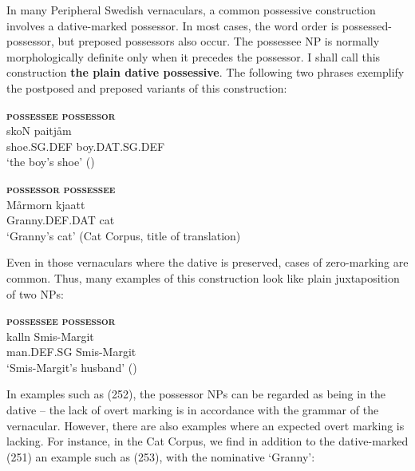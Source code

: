 In many Peripheral Swedish vernaculars, a common possessive construction involves a dative-marked possessor. In most cases, the word order is possessed-possessor, but preposed possessors also occur. The possessee NP is normally morphologically definite only when it precedes the possessor. I shall call this construction \textbf{the plain dative possessive}. The following two phrases exemplify the postposed and preposed variants of this construction:


\renewcommand{\eachwordone}{\scshape}
\renewcommand{\eachwordtwo}{\itshape}

\ea\label{}
	\glll \textbf{\textsc{possessee}} \textbf{\textsc{possessor}} \\
	skoN  paitjåm  \\
	shoe.SG.DEF  boy.DAT.SG.DEF  \\
	\glt ‘the boy’s shoe’ (\citet[22]{Marklund1976})
\z

\ea\label{}
	\glll \textbf{\textsc{possessor}} \textbf{\textsc{possessee}} \\
	Mårmorn  kjaatt\\
	Granny.DEF.DAT  cat\\
\glt ‘Granny’s cat’ (Cat Corpus, title of translation)
\z

Even in those vernaculars where the dative is preserved, cases of zero-marking are common. Thus, many examples of this construction look like plain juxtaposition of two NPs:


\ea\label{}
	\glll \textbf{\textsc{possessee}} \textbf{\textsc{possessor}} \\
	kalln  Smis-Margit \\
	man.DEF.SG  Smis-Margit\\
\glt ‘Smis-Margit’s husband’ (\citet[97]{Levander1909})
\z

In examples such as (252), the possessor NPs can be regarded as being in the dative – the lack of overt marking is in accordance with the grammar of the vernacular. However, there are also examples where an expected overt marking is lacking. For instance, in the Cat Corpus, we find in addition to the dative-marked (251) an example such as (253), with the nominative  ‘Granny’: 

